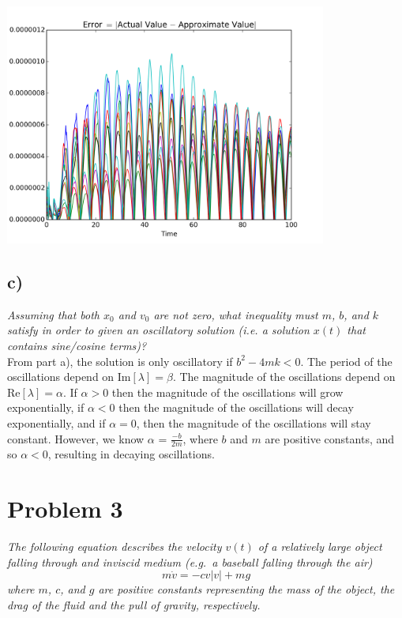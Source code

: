 \documentclass[12pt]{article}
\begin{document}
\begin{center}
	\includegraphics[width=400px]{figures/2_b_oscillation_2.png}
\end{center}

\subsection*{ c)}
{\it Assuming that both $x_0$ and $v_0$ are not zero, what inequality must $m$, $b$, and $k$ satisfy in order to given an oscillatory solution (i.e. a solution $x(t)$ that contains sine/cosine terms)?} \\

From part a), the solution is only oscillatory if $b^2 - 4mk < 0$.  The period of the oscillations depend on $\text{Im}[\lambda] = \beta$.  The magnitude of the oscillations depend on $\text{Re}[\lambda] = \alpha$.  If $\alpha > 0$ then the magnitude of the oscillations will grow exponentially, if $\alpha < 0$ then the magnitude of the oscillations will decay exponentially, and if $\alpha = 0$, then the magnitude of the oscillations will stay constant.  However, we know $\alpha$ = $\frac{-b}{2m}$, where $b$ and $m$ are positive constants, and so $\alpha < 0$, resulting in decaying oscillations.

\section*{Problem 3}
{\it The following equation describes the velocity $v(t)$ of a relatively large object falling through and inviscid medium (e.g.~a baseball falling through the air)}
\begin{equation}
	\label{change_bead}
	m\dot{v} = -cv|v| + mg
\end{equation}
{\it where $m$, $c$, and $g$ are positive constants representing the mass of the object, the drag of the fluid and the pull of gravity, respectively.}
\end{document}
